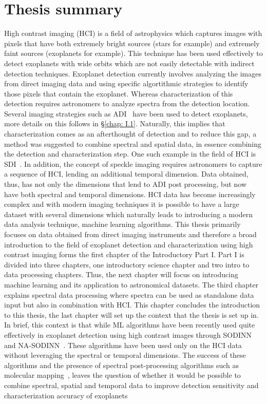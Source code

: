 \chapter*{Thesis summary}
High contrast imaging (HCI) is a field of astrophysics which captures images with pixels that have both extremely bright sources (stars for example) and extremely faint sources (exoplanets for example).
This technique has been used effectively to detect exoplanets with wide orbits which are not easily detectable with indirect detection techniques.
Exoplanet detection currently involves analyzing the images from direct imaging data and using specific algortithmic strategies to identify those pixels that contain the exoplanet.
Whereas characterization of this detection requires astronomers to analyze spectra from the detection location.
Several imaging strategies such as ADI~\citep[][]{2006MaroisADI} have been used to detect exoplanets, more details on this follows in 
\S\ref{chap: I.1}.
Naturally, this implies that characterization comes as an afterthought of detection and to reduce this gap, a method was suggested to combine spectral and spatial data, in essence combining the detection 
and characterization step.
One such example in the field of HCI is SDI~\citep[][]{2002SparksSDI}.
In addition, the concept of speckle imaging requires astronomers to capture a sequence of HCI, lending an additional temporal dimension.
Data obtained, thus, has not only the dimensions that lend to ADI post processing, but now have both spectral and temporal dimensions.
HCI data has become increasingly complex and with modern imaging techniques it is possible to have a large dataset with several dimensions which naturally
leads to introducing a modern data analysis technique, machine learning algorithms.
This thesis primarily focuses on data obtained from direct imaging instruments and therefore a broad introduction to the field of exoplanet detection and characterization using high contrast imaging forms the first chapter of the Introductory Part I.
Part I is divided into three chapters, one introductory science chapter and two intro to data processing chapters.
Thus, the next chapter will focus on introducing machine learning and its application to astronomical datasets.
The third chapter explains spectral data processing where spectra can be used as standalone data input but also in combination with HCI.
This chapter concludes the introduction to this thesis, the last chapter will set up the context that the thesis is set up in.
In brief, this context is that while ML algorithms have been recently used quite effectively in exoplanet detection using high contrast images through SODINN~\citep[][]{2018Gomez}
and NA-SODINN~\citep[][]{2023Carlito}.
These algorithms have been used only on the HCI data without leveraging the spectral or temporal dimensions. 
The success of these algorithms and the presence of spectral post-processing algorithms such as molecular mapping~\citep[][]{2018AHoeijmakersMM},
leaves the question of whether it would be possible to combine spectral, spatial and temporal data to improve detection sensitivity and characterization accuracy of exoplanets %

